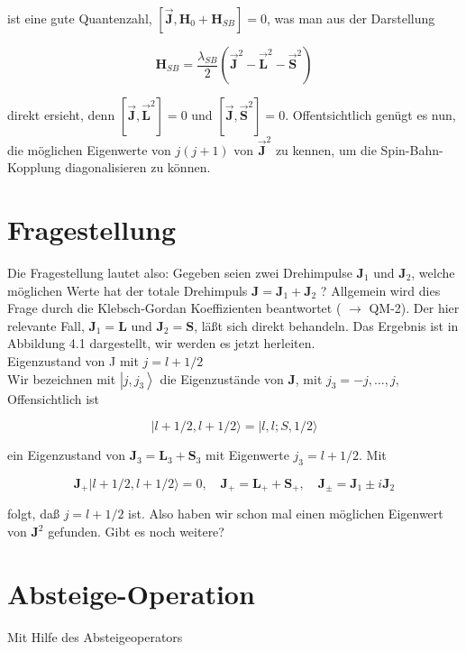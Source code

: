 \documentclass[10pt, letterpaper]{article}
\begin{document}
ist eine gute Quantenzahl, $\left[\overrightarrow{\mathbf{J}}, \mathbf{H}_{0}+\mathbf{H}_{S B}\right]=0$, was man aus der Darstellung

$$
\mathbf{H}_{S B}=\frac{\lambda_{S B}}{2}\left(\overrightarrow{\mathbf{J}}^{2}-\overrightarrow{\mathbf{L}}^{2}-\overrightarrow{\mathbf{S}}^{2}\right)
$$

direkt ersieht, denn $\left[\overrightarrow{\mathbf{J}}, \overrightarrow{\mathbf{L}}^{2}\right]=0$ und $\left[\overrightarrow{\mathbf{J}}, \overrightarrow{\mathbf{S}}^{2}\right]=0$. Offentsichtlich genügt es nun, die möglichen Eigenwerte von $j(j+1)$ von $\overrightarrow{\mathbf{J}}^{2}$ zu kennen, um die Spin-Bahn-Kopplung diagonalisieren zu können.

\section*{Fragestellung}
Die Fragestellung lautet also: Gegeben seien zwei Drehimpulse $\mathbf{J}_{1}$ und $\mathbf{J}_{2}$, welche möglichen Werte hat der totale Drehimpuls $\mathbf{J}=\mathbf{J}_{1}+\mathbf{J}_{2}$ ? Allgemein wird dies Frage durch die Klebsch-Gordan Koeffizienten beantwortet ( $\rightarrow$ QM-2). Der hier relevante Fall, $\mathbf{J}_{1}=\mathbf{L}$ und $\mathbf{J}_{2}=\mathbf{S}$, läßt sich direkt behandeln. Das Ergebnis ist in Abbildung 4.1 dargestellt, wir werden es jetzt herleiten.\\
Eigenzustand von J mit $j=l+1 / 2$\\
Wir bezeichnen mit $\left|j, j_{3}\right\rangle$ die Eigenzustände von $\mathbf{J}$, mit $j_{3}=-j, \ldots, j$, Offensichtlich ist

$$
|l+1 / 2, l+1 / 2\rangle=|l, l ; S, 1 / 2\rangle
$$

ein Eigenzustand von $\mathbf{J}_{3}=\mathbf{L}_{3}+\mathbf{S}_{3}$ mit Eigenwerte $j_{3}=l+1 / 2$. Mit

$$
\mathbf{J}_{+}|l+1 / 2, l+1 / 2\rangle=0, \quad \mathbf{J}_{+}=\mathbf{L}_{+}+\mathbf{S}_{+}, \quad \mathbf{J}_{ \pm}=\mathbf{J}_{1} \pm i \mathbf{J}_{2}
$$

folgt, daß $j=l+1 / 2$ ist. Also haben wir schon mal einen möglichen Eigenwert von $\mathbf{J}^{2}$ gefunden. Gibt es noch weitere?

\section*{Absteige-Operation}
Mit Hilfe des Absteigeoperators
\end{document}
